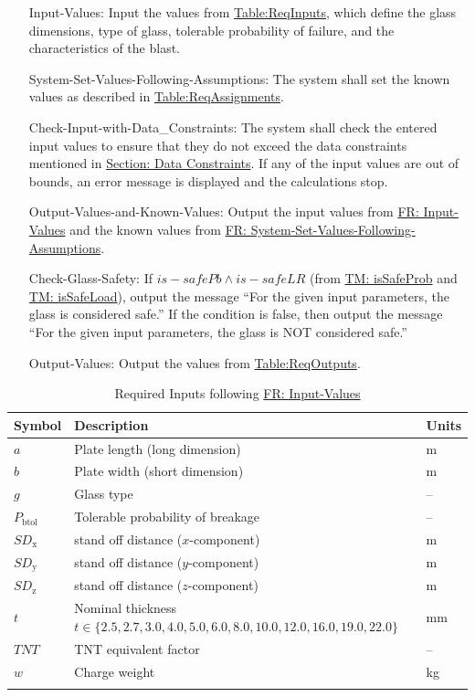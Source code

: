 \documentclass[12pt]{article}
\begin{document}
\begin{itemize}
\item[Input-Values:\phantomsection\label{inputValues}]{Input the values from \hyperref[Table:ReqInputs]{Table:ReqInputs}, which define the glass dimensions, type of glass, tolerable probability of failure, and the characteristics of the blast.}
\item[System-Set-Values-Following-Assumptions:\phantomsection\label{sysSetValsFollowingAssumps}]{The system shall set the known values as described in \hyperref[Table:ReqAssignments]{Table:ReqAssignments}.}
\item[Check-Input-with-Data\_Constraints:\phantomsection\label{checkInputWithDataCons}]{The system shall check the entered input values to ensure that they do not exceed the data constraints mentioned in \hyperref[Sec:DataConstraints]{Section: Data Constraints}. If any of the input values are out of bounds, an error message is displayed and the calculations stop.}
\item[Output-Values-and-Known-Values:\phantomsection\label{outputValsAndKnownValues}]{Output the input values from \hyperref[inputValues]{FR: Input-Values} and the known values from \hyperref[sysSetValsFollowingAssumps]{FR: System-Set-Values-Following-Assumptions}.}
\item[Check-Glass-Safety:\phantomsection\label{checkGlassSafety}]{If $is-safePb\land{}is-safeLR$ (from \hyperref[TM:isSafeProb]{TM: isSafeProb} and \hyperref[TM:isSafeLoad]{TM: isSafeLoad}), output the message ``For the given input parameters, the glass is considered safe.'' If the condition is false, then output the message ``For the given input parameters, the glass is NOT considered safe.''}
\item[Output-Values:\phantomsection\label{outputValues}]{Output the values from \hyperref[Table:ReqOutputs]{Table:ReqOutputs}.}
\end{itemize}
\begin{longtabu}{l X[l] l}
\toprule
\textbf{Symbol} & \textbf{Description} & \textbf{Units}
\\
\midrule
\endhead
$a$ & Plate length (long dimension) & m
\\
$b$ & Plate width (short dimension) & m
\\
$g$ & Glass type & --
\\
${P_{\text{b}\text{tol}}}$ & Tolerable probability of breakage & --
\\
${SD_{\text{x}}}$ & stand off distance ($x$-component) & m
\\
${SD_{\text{y}}}$ & stand off distance ($y$-component) & m
\\
${SD_{\text{z}}}$ & stand off distance ($z$-component) & m
\\
$t$ & Nominal thickness $t\in{}\{2.5,2.7,3.0,4.0,5.0,6.0,8.0,10.0,12.0,16.0,19.0,22.0\}$ & mm
\\
$TNT$ & TNT equivalent factor & --
\\
$w$ & Charge weight & kg
\\
\bottomrule
\caption{Required Inputs following \hyperref[inputValues]{FR: Input-Values}}
\label{Table:ReqInputs}
\end{longtabu}
\end{document}
